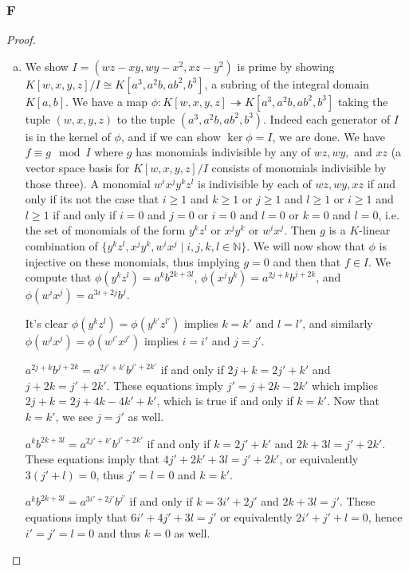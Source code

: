 \documentclass{article}
\newcommand{\N}{\mathbb{N}}
\theoremstyle{definition} %
\begin{document}
\subsubsection{F}\label{3.6.F}
\begin{proof}
    \begin{enumerate}[(a)]
        \item We show $I=(wz-xy,wy-x^2, xz-y^2)$ is prime by showing $K[w,x,y,z]/I\cong K[a^3, a^2b, ab^2, b^3]$, a subring of the integral domain $K[a,b]$. We have a map $\phi:K[w,x,y,z]\twoheadrightarrow K[a^3, a^2b, ab^2, b^3]$ taking the tuple $(w,x,y,z)$ to the tuple $(a^3, a^2b, ab^2, b^3)$. Indeed each generator of $I$ is in the kernel of $\phi$, and if we can show $\ker \phi=I$, we are done. We have $f\equiv g \mod I$ where $g$ has monomials indivisible by any of $wz, wy,$ and $xz$ (a vector space basis for $K[w,x,y,z]/I$ consists of monomials indivisible by those three). A monomial $w^i x^j y^k z^l$ is indivisible by each of $wz, wy, xz$ if and only if its not the case that $i\ge 1$ and $k\ge 1$ or $j\ge 1$ and $l\ge 1$ or $i\ge 1$ and $l\ge 1$ if and only if $i=0$ and $j=0$ or $i=0$ and $l=0$ or $k=0$ and $l=0$, i.e. the set of monomials of the form $y^kz^l$ or $x^jy^k$ or $w^ix^j$. Then $g$ is a $K$-linear combination of $\{y^kz^l, x^jy^k, w^ix^j \mid i,j,k,l\in \N\}$. We will now show that $\phi$ is injective on these monomials, thus implying $g=0$ and then that $f\in I$. We compute that $\phi(y^k z^l)=a^k b^{2k+3l}$, $\phi(x^j y^k)= a^{2j+k}b^{j+2k}$, and $\phi(w^i x^j)=a^{3i+2j}b^j$. 
        
        It's clear $\phi(y^k z^l)=\phi(y^{k'} z^{l'})$ implies $k=k'$ and $l=l'$, and similarly $\phi(w^i x^j)=\phi(w^{i'} x^{j'})$ implies $i=i'$ and $j=j'$.

        \vspace{0.1in}
        $a^{2j+k} b^{j+2k}=a^{2j'+k'} b^{j'+2k'}$ if and only if $2j+k=2j'+k'$ and $j+2k=j'+2k'$. These equations imply $j'=j+2k-2k'$ which implies $2j+k=2j+4k-4k'+k'$, which is true if and only if $k=k'$. Now that $k=k'$, we see $j=j'$ as well.

        \vspace{0.1in}
        $a^k b^{2k+3l}= a^{2j'+k'} b^{j'+2k'}$ if and only if $k=2j'+k'$ and $2k+3l=j'+2k'$. These equations imply that $4j'+2k'+3l=j'+2k'$, or equivalently $3(j'+l)=0$, thus $j'=l=0$ and $k=k'$.
        
        \vspace{0.1in}
        $a^k b^{2k+3l}=a^{3i'+2j'} b^{j'}$ if and only if $k=3i'+2j'$ and $2k+3l=j'$. These equations imply that $6i'+4j'+3l=j'$ or equivalently $2i'+j'+l=0$, hence $i'=j'=l=0$ and thus $k=0$ as well.


\end{enumerate}
\end{proof}
\end{document}
